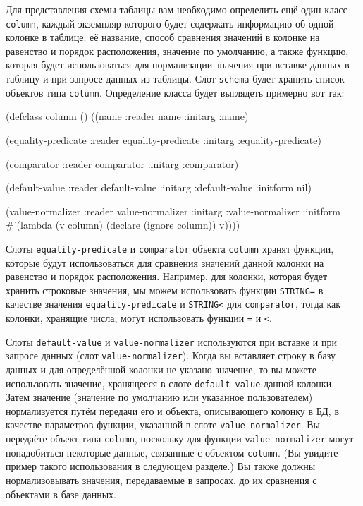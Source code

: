 Для представления схемы таблицы вам необходимо определить ещё один класс~--
\lstinline{column}, каждый экземпляр которого будет содержать информацию об одной колонке в
таблице: её название, способ сравнения значений в колонке на равенство и порядок
расположения, значение по умолчанию, а также функцию, которая будет использоваться для
нормализации значения при вставке данных в таблицу и при запросе данных из таблицы. Слот
\lstinline{schema} будет хранить список объектов типа \lstinline{column}.  Определение класса будет
выглядеть примерно вот так:

\begin{myverb}
(defclass column ()
  ((name               
    :reader name
    :initarg :name)

   (equality-predicate
    :reader equality-predicate
    :initarg :equality-predicate)

   (comparator
    :reader comparator
    :initarg :comparator)

   (default-value
    :reader default-value
    :initarg :default-value
    :initform nil)

   (value-normalizer
    :reader value-normalizer
    :initarg :value-normalizer
    :initform #'(lambda (v column) (declare (ignore column)) v))))
\end{myverb}

Слоты \lstinline{equality-predicate} и \lstinline{comparator} объекта \lstinline{column} хранят функции,
которые будут использоваться для сравнения значений данной колонки на равенство и порядок
расположения.  Например, для колонки, которая будет хранить строковые значения, мы можем
использовать функции \lstinline{STRING=} в качестве значения \lstinline{equality-predicate} и
\lstinline{STRING<} для \lstinline{comparator}, тогда как колонки, хранящие числа, могут
использовать функции \lstinline{=} и \lstinline!<!.

Слоты \lstinline{default-value} и \lstinline{value-normalizer} используются при вставке и при
запросе данных (слот \lstinline{value-normalizer}).  Когда вы вставляет строку в базу данных и
для определённой колонки не указано значение, то вы можете использовать значение,
хранящееся в слоте \lstinline{default-value} данной колонки.  Затем значение (значение по
умолчанию или указанное пользователем) нормализуется путём передачи его и объекта,
описывающего колонку в БД, в качестве параметров функции, указанной в слоте
\lstinline{value-normalizer}.  Вы передаёте объект типа \lstinline{column}, поскольку для функции
\lstinline{value-normalizer} могут понадобиться некоторые данные, связанные с объектом
\lstinline{column}. (Вы увидите пример такого использования в следующем разделе.)  Вы также
должны нормализовывать значения, передаваемые в запросах, до их сравнения с объектами в
базе данных.

